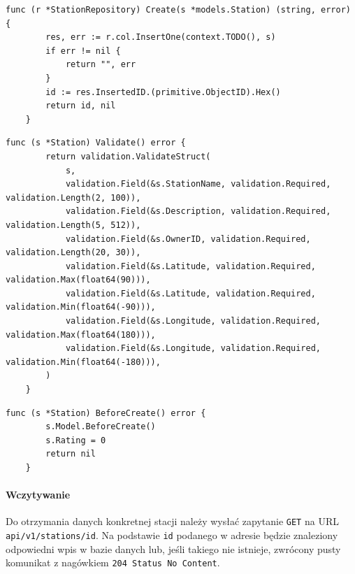 \begin{lstlisting}[label=list:repo_create_station,caption=Dodanie wpisu stacji ładowniczej do bazy danych,basicstyle=\tiny\ttfamily]
    func (r *StationRepository) Create(s *models.Station) (string, error) {
        res, err := r.col.InsertOne(context.TODO(), s)
        if err != nil {
            return "", err
        }
        id := res.InsertedID.(primitive.ObjectID).Hex()
        return id, nil
    }
\end{lstlisting}

\begin{lstlisting}[label=list:validation_station,caption=Walidacja danych stacji ładowniczej,basicstyle=\tiny\ttfamily]
    func (s *Station) Validate() error {
        return validation.ValidateStruct(
            s,
            validation.Field(&s.StationName, validation.Required, validation.Length(2, 100)),
            validation.Field(&s.Description, validation.Required, validation.Length(5, 512)),
            validation.Field(&s.OwnerID, validation.Required, validation.Length(20, 30)),
            validation.Field(&s.Latitude, validation.Required, validation.Max(float64(90))),
            validation.Field(&s.Latitude, validation.Required, validation.Min(float64(-90))),
            validation.Field(&s.Longitude, validation.Required, validation.Max(float64(180))),
            validation.Field(&s.Longitude, validation.Required, validation.Min(float64(-180))),
        )
    }
\end{lstlisting}

\begin{lstlisting}[label=list:before_create_station,caption=Uzupełnienie danych systemowych dotyczących,basicstyle=\tiny\ttfamily]
    func (s *Station) BeforeCreate() error {
        s.Model.BeforeCreate()
        s.Rating = 0
        return nil
    }
\end{lstlisting}

\paragraph{Wczytywanie\newline}
Do otrzymania danych konkretnej stacji należy wysłać zapytanie \texttt{GET} na URL \texttt{api/v1/stations/{id}}. Na podstawie \texttt{id} podanego w adresie będzie znaleziony odpowiedni wpis w bazie danych lub, jeśli takiego nie istnieje, zwrócony pusty komunikat z nagówkiem \texttt{204 Status No Content}.

